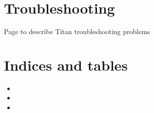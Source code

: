 \documentclass[letterpaper,10pt,english]{sphinxmanual}
\begin{document}
\chapter{Troubleshooting}
\label{\detokenize{docs/Titan/troubleshooting:troubleshooting}}\label{\detokenize{docs/Titan/troubleshooting::doc}}
Page to describe Titan troubleshooting problems


\chapter{Indices and tables}
\label{\detokenize{index:indices-and-tables}}\begin{itemize}
\item {} 

\item {} 

\item {} 

\end{itemize}



\renewcommand{\indexname}{Index}
\printindex
\end{document}
